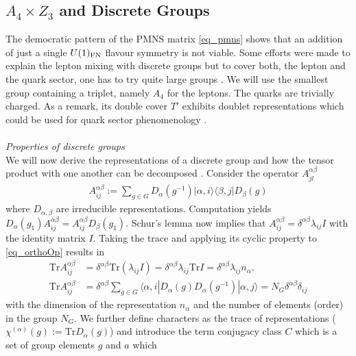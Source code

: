 
\subsection{$A_4\times Z_3$ and Discrete Groups}
\label{sec_A4GT}
The democratic pattern of the PMNS matrix \eqref{eq_pmns} shows that an addition of just a single $U(1)_\text{FN}$ flavour symmetry is not viable. Some efforts
were made to explain the lepton mixing with discrete groups but to cover both, the lepton and the quark sector, one has to try quite large groups
\cite{1605.03581}. We will use the smallest group containing a triplet, namely $A_4$ for the leptons. The quarks are trivially charged.
As a remark, its double cover $T'$ exhibits doublet representations which could be used for quark sector phenomenology \cite{Tprime}. 
\\ \\ \textit{Properties of discrete groups}\\
\noindent  We will now derive the representations of a discrete group and how the tensor product with one another can be decomposed \cite{1003.3552}. 
Consider the operator $A^{\alpha\beta}_{jl}$ \cite{georgi}
\begin{align}
 A^{\alpha\beta}_{ij} := \sum\limits_{g\in G} D_\alpha(g^{-1})|\alpha,i\rangle\langle \beta,j|D_\beta(g)
 \label{eq_orthoOp}
\end{align}
where $D_{\alpha,\beta}$ are irreducible representations. Computation yields $D_\alpha(g_1)A^{\alpha\beta}_{ij} = A^{\alpha\beta}_{ij}D_\beta(g_1)$. Schur's lemma now implies that
 $A^{\alpha\beta}_{ij}=\delta^{\alpha\beta} \lambda_{ij} I$ with the identity matrix $I$. Taking the trace and applying its cyclic property to \eqref{eq_orthoOp}
results in
\begin{align}
 \text{Tr}A^{\alpha\beta}_{ij} &= \delta^{\alpha\beta}\text{Tr}\left(\lambda_{ij} I\right) = \delta^{\alpha\beta}\lambda_{ij} \text{Tr}I = \delta^{\alpha\beta}\lambda_{ij}n_\alpha,\\
 \text{Tr}A^{\alpha\beta}_{ij} &= \delta^{\alpha\beta}\sum\limits_{g\in G} \langle \alpha,i\left| D_\alpha(g)D_\alpha(g^{-1}) \right|\alpha,j\rangle = N_G \delta^{\alpha\beta}\delta_{ij}
 \label{eq_orthoRelA}
\end{align}
with the dimension of the representation $n_\alpha$ and the number of elements (order) in the group $N_G$. We further define characters as the trace of
representations ($\chi^{(\alpha)}(g):= \text{Tr}D_\alpha(g)$) and introduce the term conjugacy class $C$ which is a set of group elements $g$ and $a$ which 
